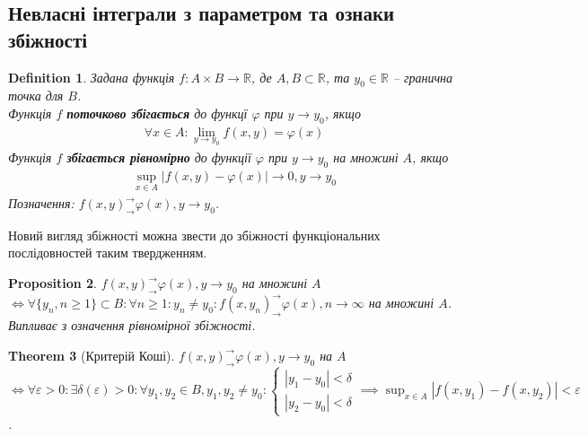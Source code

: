 \documentclass[a4paper, 10pt]{article}
\def\huge{\displaystyle}
\theoremstyle{theoremdd}
\newtheorem{theorem}{Theorem}[subsection]
\theoremstyle{theoremdd}
\theoremstyle{theoremdd}
\newtheorem{definition}[theorem]{Definition}
\theoremstyle{theoremdd}
\theoremstyle{theoremdd}
\theoremstyle{theoremdd}
\newtheorem{proposition}[theorem]{Proposition}
\theoremstyle{theoremdd}
\theoremstyle{theoremdd}
\theoremstyle{theoremdd}
\begin{document}
\subsection{Невласні інтеграли з параметром та ознаки збіжності}
\begin{definition}
Задана функція $f \colon A \times B \to \mathbb{R}$, де $A,B \subset \mathbb{R}$, та $y_0 \in \mathbb{R}$ -- гранична точка для $B$.\\
Функція $f$ \textbf{поточково збігається} до функцї $\varphi$ при $y \to y_0$, якщо
\begin{align*}
\forall x \in A: \lim_{y \to y_0} f(x,y) = \varphi(x)
\end{align*}
Функція $f$ \textbf{збігається рівномірно} до функції $\varphi$ при $y \to y_0$ на множині $A$, якщо
\begin{align*}
\huge\sup_{x \in A} |f(x,y) - \varphi(x)| \to 0, y \to y_0
\end{align*}
Позначення: $f(x,y)^\rightarrow_\rightarrow \varphi(x), y \to y_0$.
\end{definition}

Новий вигляд збіжності можна звести до збіжності функціональних послідовностей таким твердженням.

\begin{proposition}
$f(x,y)^\rightarrow_\rightarrow \varphi(x), y \to y_0$ на множині $A$ $\iff \forall \{y_n, n \geq 1\} \subset B: \forall n \geq 1: y_n \neq y_0: f(x,y_n)^\rightarrow_\rightarrow \varphi(x), n \to \infty$ на множині $A$.\\
\textit{Випливає з означення рівномірної збіжності.}
\end{proposition}

\begin{theorem}[Критерій Коші]
$f(x,y)^\rightarrow_\rightarrow \varphi(x), y \to y_0$ на $A$ $\iff \forall \varepsilon > 0: \exists \delta(\varepsilon) > 0: \forall y_1,y_2 \in B, y_1,y_2 \neq y_0: \begin{cases} |y_1-y_0| < \delta \\ |y_2-y_0| < \delta \end{cases} \implies \huge\sup_{x \in A} |f(x,y_1)-f(x,y_2)| < \varepsilon$.\\
\end{theorem}
\end{document}
